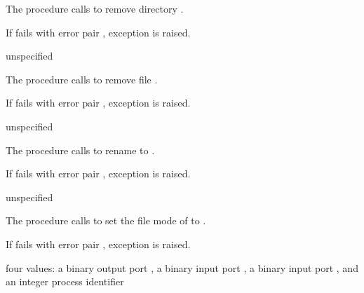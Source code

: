 The  procedure calls
 to remove directory .

If  fails with error pair
, exception  is raised.

\begin{procedure}
\end{procedure}
\returns{} unspecified

The  procedure calls  to remove
file .

If  fails with error pair , exception  is raised.

\begin{procedure}
\end{procedure}
\returns{} unspecified

The  procedure calls  to rename
 to .

If  fails with error pair , exception  is raised.

\begin{procedure}
\end{procedure}
\returns{} unspecified

The  procedure calls  to set the
file mode of  to .

If  fails with error pair , exception  is raised.

\begin{procedure}
\end{procedure}
\returns{} four values: a binary output port , a binary
input port , a binary input port ,
and an integer process identifier 

